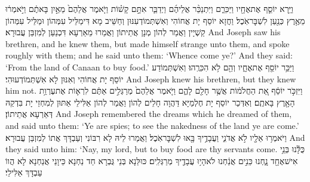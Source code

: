 {וַיַּ֥רְא יוֹסֵ֛ף אֶת\maqqaf אֶחָ֖יו וַיַּכִּרֵ֑ם וַיִּתְנַכֵּ֨ר אֲלֵיהֶ֜ם וַיְדַבֵּ֧ר אִתָּ֣ם קָשׁ֗וֹת וַיֹּ֤אמֶר אֲלֵהֶם֙ מֵאַ֣יִן בָּאתֶ֔ם וַיֹּ֣אמְר֔וּ מֵאֶ֥רֶץ כְּנַ֖עַן לִשְׁבׇּר\maqqaf אֹֽכֶל׃}
{וַחֲזָא יוֹסֵף יָת אֲחוֹהִי וְאִשְׁתְּמוֹדְעִנּוּן וְחַשֵּׁיב מָא דִּימַלֵּיל עִמְּהוֹן וּמַלֵּיל עִמְּהוֹן קַשְׁיָין וַאֲמַר לְהוֹן מְנָן אֲתֵיתוֹן וַאֲמַרוּ מֵאַרְעָא דִּכְנַעַן לְמִזְבַּן עֲבוּרָא׃}
{And Joseph saw his brethren, and he knew them, but made himself strange unto them, and spoke roughly with them; and he said unto them: ‘Whence come ye?’ And they said: ‘From the land of Canaan to buy food.’}{}
{וַיַּכֵּ֥ר יוֹסֵ֖ף אֶת\maqqaf אֶחָ֑יו וְהֵ֖ם לֹ֥א הִכִּרֻֽהוּ׃}
{וְאִשְׁתְּמוֹדַע יוֹסֵף יָת אֲחוֹהִי וְאִנּוּן לָא אִשְׁתְּמוֹדְעוּהִי׃}
{And Joseph knew his brethren, but they knew him not.}{}
{וַיִּזְכֹּ֣ר יוֹסֵ֔ף אֵ֚ת הַחֲלֹמ֔וֹת אֲשֶׁ֥ר חָלַ֖ם לָהֶ֑ם וַיֹּ֤אמֶר אֲלֵהֶם֙ מְרַגְּלִ֣ים אַתֶּ֔ם לִרְא֛וֹת אֶת\maqqaf עֶרְוַ֥ת הָאָ֖רֶץ בָּאתֶֽם׃}
{וְאִדְּכַר יוֹסֵף יָת חֶלְמַיָּא דַּהֲוָה חָלֵים לְהוֹן וַאֲמַר לְהוֹן אַלִּילֵי אַתּוּן לְמִחְזֵי יָת בִּדְקַהּ דְּאַרְעָא אֲתֵיתוֹן׃}
{And Joseph remembered the dreams which he dreamed of them, and said unto them: ‘Ye are spies; to see the nakedness of the land ye are come.’}{}
{וַיֹּאמְר֥וּ אֵלָ֖יו לֹ֣א אֲדֹנִ֑י וַעֲבָדֶ֥יךָ בָּ֖אוּ לִשְׁבׇּר\maqqaf אֹֽכֶל׃}
{וַאֲמַרוּ לֵיהּ לָא רִבּוֹנִי וְעַבְדָּךְ אֲתוֹ לְמִזְבַּן עֲבוּרָא׃}
{And they said unto him: ‘Nay, my lord, but to buy food are thy servants come.}{}
{כֻּלָּ֕נוּ בְּנֵ֥י אִישׁ\maqqaf אֶחָ֖ד נָ֑חְנוּ כֵּנִ֣ים אֲנַ֔חְנוּ לֹא\maqqaf הָי֥וּ עֲבָדֶ֖יךָ מְרַגְּלִֽים׃}
{כּוּלַּנָא בְּנֵי גֻּבְרָא חַד נַחְנָא כֵּיוָנֵי אֲנַחְנָא לָא הֲווֹ עַבְדָּךְ אַלִּילֵי׃}
